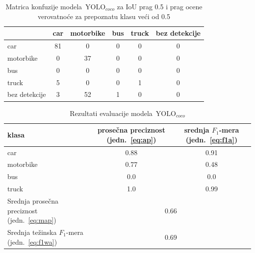 \documentclass[12pt,oneside]{memoir}
\newcommand{\yolo}{\ensuremath{\,\textrm{YOLO}}}
\begin{document}
\begin{table}
    \begin{center}
    \caption{Matrica konfuzije modela $\yolo_{coco}$ za IoU prag 0.5 i prag ocene verovatnoće za prepoznatu klasu veći od 0.5 }
    \begin{tabular}{ l|c|c|c|c|c|}
                  & car  & motorbike & bus & truck & bez detekcije \\ \hline
    car           & 81   & 0         & 0   & 0     & 0             \\ 
    motorbike     & 0    & 37        & 0   & 0     & 0             \\ 
    bus           & 0    & 0         & 0   & 0     & 0             \\ 
    truck         & 5    & 0         & 0   & 1     & 0             \\ 
    bez detekcije & 3    & 52        & 1   & 0     & 0             \\ \hline
    \hline
    \end{tabular}
    \label{tab:section4_yolo4base_confusionmatrix}
    \end{center}
\end{table}


\begin{table}
    \begin{center}
    \caption{Rezultati evaluacije modela $\yolo_{coco}$}
        \begin{tabular}{|m{10em}|c|c|}
        \toprule
        klasa     & prosečna preciznost (jedn.~\ref{eq:ap}) & srednja $F_1$-mera (jedn.~\ref{eq:f1a})  \\ \hline
        \midrule
        car       & 0.88  & 0.91 \\ \hline
        motorbike & 0.77  & 0.48 \\ \hline
        bus       & 0.0   & 0.0  \\ \hline
        truck     & 1.0   & 0.99 \\ \hline
        \bottomrule
        Srednja prosečna preciznost (jedn.~\ref{eq:map}) & \multicolumn{2}{c|}{0.66}  \\ \hline
        Srednja težinska $F_1$-mera (jedn.~\ref{eq:f1wa}) & \multicolumn{2}{c|}{0.69}  \\ \hline
    \end{tabular}
    \label{tab:section4_yolo4base_results}
    \end{center}
\end{table}
\end{document}
